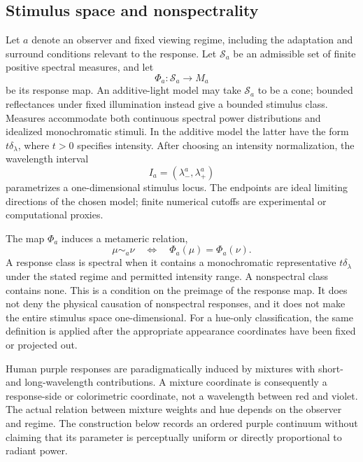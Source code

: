\documentclass[9pt,twocolumn,twoside]{opticajnl}
\theoremstyle{plain}
\begin{document}
\subsection{Stimulus space and nonspectrality}
Let $a$ denote an observer and fixed viewing regime, including the adaptation and surround conditions relevant to the response. Let $\mathcal S_a$ be an admissible set of finite positive spectral measures, and let
\begin{equation}
 \Phi_a:\mathcal S_a\longrightarrow M_a
 \label{eq:response}
\end{equation}
be its response map. An additive-light model may take $\mathcal S_a$ to be a cone; bounded reflectances under fixed illumination instead give a bounded stimulus class. Measures accommodate both continuous spectral power distributions and idealized monochromatic stimuli. In the additive model the latter have the form $t\delta_\lambda$, where $t>0$ specifies intensity. After choosing an intensity normalization, the wavelength interval
\begin{equation}
 I_a=(\lambda_-^a,\lambda_+^a)
 \label{eq:interval}
\end{equation}
parametrizes a one-dimensional stimulus locus. The endpoints are ideal limiting directions of the chosen model; finite numerical cutoffs are experimental or computational proxies.

The map $\Phi_a$ induces a metameric relation,
\begin{equation}
 \mu\sim_a\nu\quad\Longleftrightarrow\quad\Phi_a(\mu)=\Phi_a(\nu).
 \label{eq:metamerism}
\end{equation}
A response class is spectral when it contains a monochromatic representative $t\delta_\lambda$ under the stated regime and permitted intensity range. A nonspectral class contains none. This is a condition on the preimage of the response map. It does not deny the physical causation of nonspectral responses, and it does not make the entire stimulus space one-dimensional. For a hue-only classification, the same definition is applied after the appropriate appearance coordinates have been fixed or projected out.

Human purple responses are paradigmatically induced by mixtures with short- and long-wavelength contributions. A mixture coordinate is consequently a response-side or colorimetric coordinate, not a wavelength between red and violet. The actual relation between mixture weights and hue depends on the observer and regime. The construction below records an ordered purple continuum without claiming that its parameter is perceptually uniform or directly proportional to radiant power.
\end{document}
